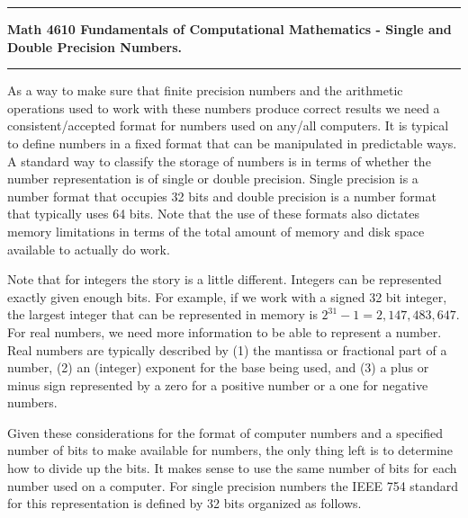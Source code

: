 \documentclass[10pt,fleqn]{article}
\begin{document}
\vskip0.1in\hrule\vskip0.1in
\noindent
{\bf Math 4610 Fundamentals of Computational Mathematics  -  Single and Double
 Precision Numbers.}
\vskip0.1in\hrule\vskip0.1in
\noindent
As a way to make sure that finite precision numbers and the arithmetic
operations used to work with these numbers produce correct results we need a
consistent/accepted format for numbers used on any/all computers. It is typical
to define numbers in a fixed format that can be manipulated in predictable ways.
A standard way to classify the storage of numbers is in terms of whether the
number representation is of single or double precision. Single precision is a
number format that occupies 32 bits and double precision is a number format that
typically uses 64 bits. Note that the use of these formats also dictates memory
limitations in terms of the total amount of memory and disk space available to
actually do work.

Note that for integers the story is a little different. Integers can be
represented exactly given enough bits. For example, if we work with a
signed 32 bit integer, the largest integer that can be represented in memory is
$2^{31}-1=2,147,483,647$. For real numbers, we need more information to be able
to represent a number. Real numbers are typically described by (1) the mantissa
or fractional part of a number, (2) an (integer) exponent for the base being
used, and (3) a plus or minus sign represented by a zero for a positive number
or a one for negative numbers.

Given these considerations for the format of computer numbers and a specified
number of bits to make available for numbers, the only thing left is to
determine how to divide up the bits. It makes sense to use the same number of
bits for each number used on a computer. For single precision numbers the IEEE
754 standard for this representation is defined by 32 bits organized as follows.
\end{document}

